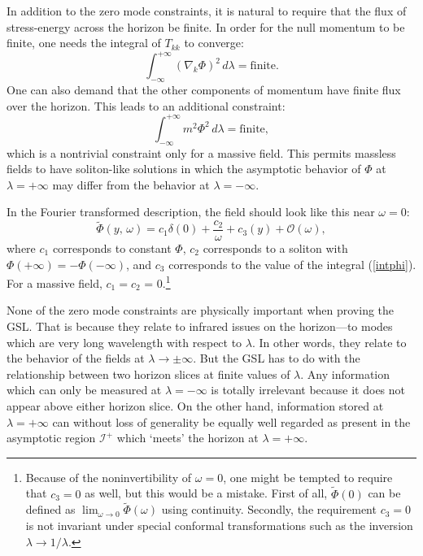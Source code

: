\documentclass{article}
\begin{document}
In addition to the zero mode constraints, it is natural to require that the flux of stress-energy across the horizon be finite.  In order for the null momentum to be finite, one needs the integral of $T_{kk}$ to converge:
\begin{equation}
\int_{-\infty}^{+\infty} (\nabla_k \Phi)^2 \,d\lambda = \mathrm{finite}.
\end{equation}
One can also demand that the other components of momentum have finite flux over the horizon.  This leads to an additional constraint:
\begin{equation}\label{intphi}
\int_{-\infty}^{+\infty} m^2 \Phi^2 \,d\lambda = \mathrm{finite},
\end{equation}
which is a nontrivial constraint only for a massive field.  This permits massless fields to have soliton-like solutions in which the asymptotic behavior of $\Phi$ at $\lambda = +\infty$ may differ from the behavior at $\lambda = -\infty$.

In the Fourier transformed description, the field should look like this near $\omega = 0$:
\begin{equation}
\tilde{\Phi}(y,\,\omega) = c_1 \delta(0) + \frac{c_2}{\omega} + c_3(y) + \mathcal{O}(\omega),
\end{equation}
where $c_1$ corresponds to constant $\Phi$, $c_2$ corresponds to a soliton with $\Phi(+\infty) = -\Phi(-\infty)$, and $c_3$ corresponds to the value of the integral (\ref{intphi}).  For a massive field, $c_1 = c_2$ = 0.\footnote{Because of the noninvertibility of $\omega = 0$, one might be tempted to require that $c_3 = 0$ as well, but this would be a mistake.  First of all,
$\tilde{\Phi}(0)$ can be defined as $\lim_{\omega \to 0} \tilde{\Phi}(\omega)$ using continuity.  Secondly, the requirement $c_3 = 0$ is not invariant under special conformal transformations such as the inversion $\lambda \to 1/\lambda$.}

None of the zero mode constraints are physically important when proving the GSL.  That is because they relate to infrared issues on the horizon---to modes which are very long wavelength with respect to $\lambda$.  In other words, they relate to the behavior of the fields at $\lambda \to \pm \infty$.  But the GSL has to do with the relationship between two horizon slices at finite values of $\lambda$.  Any information which can only be measured at $\lambda = -\infty$ is totally irrelevant because it does not appear above either horizon slice.  On the other hand, information stored at $\lambda = +\infty$ can without loss of generality be equally well regarded as present in the asymptotic region $\mathcal{I}^+$ which `meets' the horizon at $\lambda = +\infty$.
\end{document}
